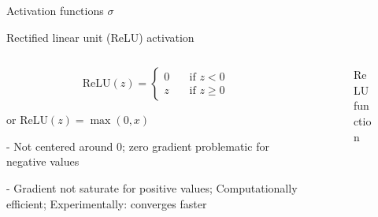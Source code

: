 \documentclass[12pt]{beamer}
\begin{document}
\begin{frame}{Activation functions $\sigma$}
	
	Rectified linear unit (ReLU) activation
	
	\begin{columns}
		
	\begin{column}{0.6\linewidth}
		
		$$
		\mathrm{ReLU}(z) =
		\begin{cases}
		0  & \quad \text{if } z < 0\\
		z  & \quad \text{if } z \geq 0
		\end{cases}
		$$
	
	or \hspace{0.4em} $\mathrm{ReLU}(z) = \max(0, x)$
		
	{\small - Not centered around $0$; zero gradient problematic for negative values}	
	
	{\small - Gradient not saturate for positive values; Computationally efficient; Experimentally: converges faster}	
		
		
	\end{column}
	
	\begin{column}{0.4\linewidth}
	\begin{figure}
		\caption{ReLU function}
	\end{figure}
		\end{column}
		\end{columns}
	

\end{frame}
\end{document}
